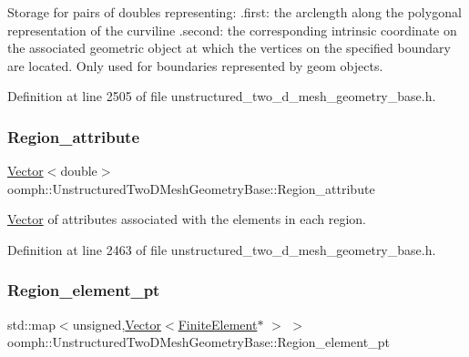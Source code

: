 Storage for pairs of doubles representing\+: .first\+: the arclength along the polygonal representation of the curviline .second\+: the corresponding intrinsic coordinate on the associated geometric object at which the vertices on the specified boundary are located. Only used for boundaries represented by geom objects. 



Definition at line 2505 of file unstructured\+\_\+two\+\_\+d\+\_\+mesh\+\_\+geometry\+\_\+base.\+h.

\mbox{\label{classoomph_1_1UnstructuredTwoDMeshGeometryBase_a8f809ba6140c7d14c08dcefddd9674e3}} 
\subsubsection{\texorpdfstring{Region\+\_\+attribute}{Region\_attribute}}
{\footnotesize\ttfamily \hyperlink{classoomph_1_1Vector}{Vector}$<$double$>$ oomph\+::\+Unstructured\+Two\+D\+Mesh\+Geometry\+Base\+::\+Region\+\_\+attribute\hspace{0.3cm}{\ttfamily [protected]}}



\hyperlink{classoomph_1_1Vector}{Vector} of attributes associated with the elements in each region. 



Definition at line 2463 of file unstructured\+\_\+two\+\_\+d\+\_\+mesh\+\_\+geometry\+\_\+base.\+h.

\mbox{\label{classoomph_1_1UnstructuredTwoDMeshGeometryBase_a409ca5d71a2010d3ab423726d8ca76aa}} 
\subsubsection{\texorpdfstring{Region\+\_\+element\+\_\+pt}{Region\_element\_pt}}
{\footnotesize\ttfamily std\+::map$<$unsigned,\hyperlink{classoomph_1_1Vector}{Vector}$<$\hyperlink{classoomph_1_1FiniteElement}{Finite\+Element}$\ast$ $>$ $>$ oomph\+::\+Unstructured\+Two\+D\+Mesh\+Geometry\+Base\+::\+Region\+\_\+element\+\_\+pt\hspace{0.3cm}{\ttfamily [protected]}}



